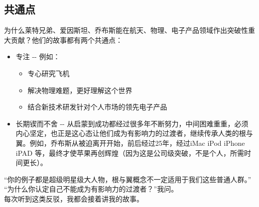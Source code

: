 \hypertarget{ux5171ux901aux70b9}{%
\subsection{共通点}\label{ux5171ux901aux70b9}}

为什么莱特兄弟、爱因斯坦、乔布斯能在航天、物理、电子产品领域作出突破性重大贡献？他们的故事都有两个共通点：

\begin{itemize}
\tightlist
\item
  专注 -\/- 例如：

  \begin{itemize}
  \tightlist
  \item
    专心研究飞机
  \item
    解决物理难题，更好理解这个世界
  \item
    结合新技术研发针对个人市场的领先电子产品
  \end{itemize}
\item
  长期锲而不舍 -\/-
  从启蒙到成功都经过很多年不断努力，中间困难重重，必须内心坚定，也正是这心态让他们成为有影响力的过渡者，继续传承人类的根与翼。例如，乔布斯从被迫离开开始，前后经过25年，经过iMac
  iPod iPhone iPAD
  等，最终才使苹果再创辉煌（因为这是公司级突破，不是个人，所需时间更长）。
\end{itemize}

``你的例子都是超级明星级大人物，根与翼概念不一定适用于我们这些普通人群。''\\
``为什么你认定自己不能成为有影响力的过渡者？''我问。\\
每次听到这类反驳，我都会接着讲我的故事。

